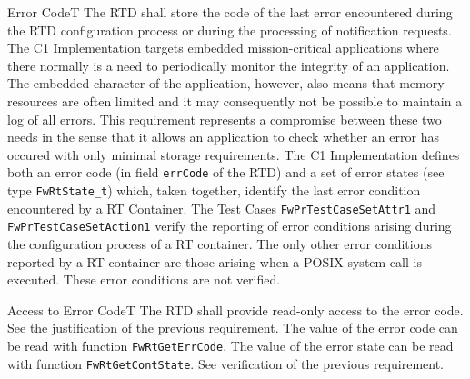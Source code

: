 \documentclass[requirements]{../fwprofile}
\begin{document}
\begin{fw_req}{Error Code}{T}
{The RTD shall store the code of the last error encountered during the RTD 
configuration process or during the processing of notification requests.}
{The C1 Implementation targets embedded mission-critical applications where there normally is a need to periodically monitor the integrity of an application. The embedded character of the application, however, also means that memory resources are often limited and it may consequently not be possible to maintain a log of all errors. This requirement represents a compromise between these two needs in the sense that it allows an application to check whether an error has occured with only minimal storage requirements.}
{The C1 Implementation defines both an error code (in field \texttt{errCode} of the RTD) and a set of error states (see type \texttt{FwRtState\_t}) which, taken together, identify the last error condition encountered by a RT Container.} 
{The Test Cases \texttt{FwPrTestCaseSetAttr1} and \texttt{FwPrTestCaseSetAction1} verify the reporting of error conditions arising during the configuration process of a RT container. The only other error conditions reported by a RT container are those arising when a POSIX system call is executed. These error conditions are not verified.}
\end{fw_req}


\begin{fw_req}{Access to Error Code}{T}
{The RTD shall provide read-only access to the error code.}
{See the justification of the previous requirement.}
{The value of the error code can be read with function \texttt{FwRtGetErrCode}. The value of the error state can be read with function \texttt{FwRtGetContState}.} 
{See verification of the previous requirement.}
\end{fw_req}
\end{document}
